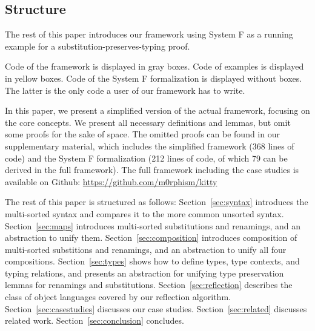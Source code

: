 \documentclass[a4paper, UKenglish, cleveref, autoref, thm-restate]{lipics-v2021}
\begin{document}
  \subsection{Structure}
  \label{sec:introduction:structure}

  The rest of this paper introduces our framework using System F
  as a running example for a substitution-preserves-typing proof.

  Code of the framework is displayed in gray boxes.
  Code of examples is displayed in yellow boxes.
  Code of the System F formalization is displayed without boxes. The
  latter is the only code a user of our framework has to write.

  In this paper, we present a simplified version of the actual
  framework, focusing on the core concepts. We present all necessary
  definitions and lemmas, but omit some proofs for the sake of
  space. The omitted proofs can be found in our supplementary material,
  which includes the simplified framework (368 lines of code) and the
  System F formalization (212 lines of code, of which 79 can be derived in the full framework).
  The full framework including the case studies is available on Github:
  \textcolor{blue}{\url{https://github.com/m0rphism/kitty}}

  The rest of this paper is structured as follows:
  Section~\ref{sec:syntax} introduces the multi-sorted syntax and compares it to the
  more common unsorted syntax.
  Section~\ref{sec:maps} introduces multi-sorted substitutions and renamings, and
  an abstraction to unify them.
  Section~\ref{sec:composition} introduces composition of multi-sorted
  substitions and renamings, and an abstraction to unify all four
  compositions.
  Section~\ref{sec:types} shows how to define types,
  type contexts, and typing relations,
  and presents an abstraction for unifying type preservation lemmas for renamings and substitutions.
  Section~\ref{sec:reflection} describes the class of object languages covered by
  our reflection algorithm.
  Section~\ref{sec:casestudies} discusses our case studies.
  Section~\ref{sec:related} discusses related work.
  Section~\ref{sec:conclusion} concludes.
\end{document}
